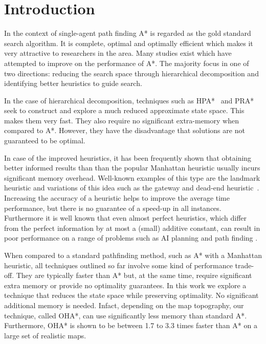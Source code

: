 \section{Introduction}
In the context of single-agent path finding A* \cite{hart68} is regarded as 
the gold standard search algorithm.
It is complete, optimal and optimally efficient which makes it very attractive 
to researchers in the area.
Many studies exist which have attempted to improve on the performance of A*. 
The majority focus in one of two directions: reducing the search space through hierarchical 
decomposition and identifying better heuristics to guide search. 
\par
In the case of hierarchical decomposition, techniques such as
HPA*~\cite{botea04} and PRA*~\cite{sturtevant05} seek to construct and explore
a much reduced approximate state space.
This makes them very fast. 
They also require no significant extra-memory when compared to A*.
However, they have the disadvantage that solutions are not guaranteed to be optimal.
\par
In case of the improved heuristics, it has been frequently shown
that obtaining better informed results than than the popular
Manhattan heuristic usually incurs significant memory overhead.
Well-known examples of this type are the landmark heuristic 
\cite{goldberg05,Cazenave:06} and variations of this idea such as the gateway and dead-end
heuristic~\cite{bjornsson06}.
Increasing the accuracy of a heuristic helps to improve the average time performance,
but there is no guarantee of a speed-up in all instances.
Furthermore it is well known that even almost perfect heuristics,
which differ from the perfect information by at most a (small) additive constant,
can result in poor performance on a range of problems such as AI planning and path finding
\cite{helmert08,pohl77}.
\par
When compared to a standard pathfinding method, such as A* with a Manhattan heuristic,
all techniques outlined so far involve some kind of performance trade-off.
They are typically faster than A* but, at the same time, require significant
extra memory or provide no optimality guarantees.
In this work we explore a technique that reduces the state space while preserving optimality.
No significant additional memory is needed. 
Infact, depending on the map topography, our technique, called OHA*, 
can use significantly less memory than standard A*.
Furthermore, OHA* is shown to be between 1.7 to 3.3 
times faster than A* on a large set of realistic maps.


